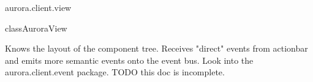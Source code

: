 \begin{texdocpackage}{aurora.client.view}
\label{texdoclet:aurora.client.view}

\begin{texdocclass}{class}{AuroraView}
\label{texdoclet:aurora.client.view.AuroraView}
\begin{texdocclassintro}
Knows the layout of the component tree.
 Receives "direct" events from actionbar and emits more semantic events onto the event bus.
 Look into the aurora.client.event package.
 TODO this doc is incomplete.\end{texdocclassintro}
\begin{texdocclassconstructors}
\end{texdocclassconstructors}
\begin{texdocclassmethods}
\end{texdocclassmethods}
\end{texdocclass}


\end{texdocpackage}



